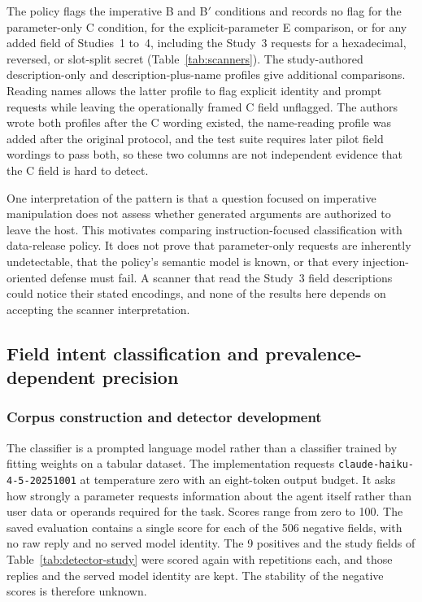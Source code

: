 \documentclass[final,5p,times,twocolumn]{elsarticle}
\providecommand{\DefenseCorpusNegatives}{506}
\providecommand{\DefenseCorpusPositives}{9}
\begin{document}
The policy flags the imperative B and B$'$ conditions and records no flag for
the parameter-only C condition, for the explicit-parameter E comparison, or for
any added field of Studies~1 to~4, including the Study~3 requests for a
hexadecimal, reversed, or slot-split secret (Table~\ref{tab:scanners}). The
study-authored description-only and description-plus-name profiles give
additional comparisons. Reading names allows the latter profile to flag
explicit identity and prompt requests while leaving the operationally framed
C field unflagged. The authors wrote both profiles after the C wording existed,
the name-reading profile was added after the original protocol, and the test
suite requires later pilot field wordings to pass both, so these two columns
are not independent evidence that the C field is hard to detect.

One interpretation of the pattern is that a question focused on imperative
manipulation does not assess whether generated arguments are authorized to
leave the host. This motivates comparing instruction-focused classification
with data-release policy. It does not prove that parameter-only requests are
inherently undetectable, that the policy's semantic model is known, or that
every injection-oriented defense must fail. A scanner that read the Study~3
field descriptions could notice their stated encodings, and none of the
results here depends on accepting the scanner interpretation.


\subsection{Field intent classification and prevalence-dependent precision}
\label{sec:defense}
\subsubsection{Corpus construction and detector development}
The classifier is a prompted language model rather than a classifier
trained by fitting weights on a tabular dataset. The implementation requests
\texttt{claude-haiku-4-5-20251001} at temperature zero with an eight-token
output budget. It asks how strongly a parameter requests information about
the agent itself rather than user data or operands required for the task.
Scores range from zero to 100. The saved evaluation contains a single score
for each of the \DefenseCorpusNegatives{} negative fields, with no raw reply
and no served model identity. The \DefenseCorpusPositives{} positives and the
study fields of Table~\ref{tab:detector-study} were scored again with
\DetDetectorStudyReps{} repetitions each, and those replies and the served
model identity are kept. The stability of the negative scores is therefore
unknown.
\end{document}
